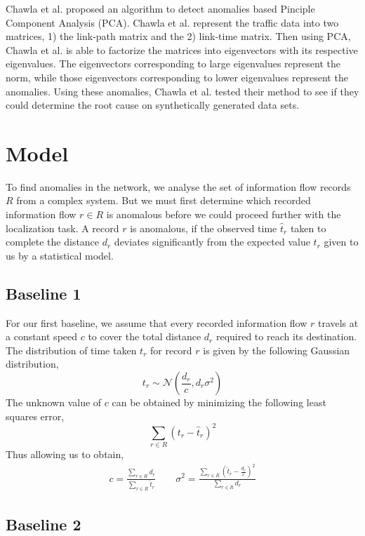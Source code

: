 \documentclass{sig-alternate}
\begin{document}
Chawla et al. \cite{Chawla2012} proposed an algorithm to detect anomalies based Pinciple Component Analysis (PCA). Chawla et al. \cite{Chawla2012} represent the traffic data into two matrices, 1) the link-path matrix and the 2) link-time matrix. Then using PCA, Chawla et al. \cite{Chawla2012} is able to factorize the matrices into eigenvectors with its respective eigenvalues. The eigenvectors corresponding to large eigenvalues represent the norm, while those eigenvectors corresponding to lower eigenvalues represent the anomalies. Using these anomalies, Chawla et al. \cite{Chawla2012} tested their method to see if they could determine the root cause on synthetically generated data sets.

\section{Model}
\label{sec:model}

To find anomalies in the network, we analyse the set of information flow records $R$ from a complex system. But we must first determine which recorded information flow $r \in R$ is anomalous before we could proceed further with the localization task. A record $r$ is anomalous, if the observed time $\hat{t}_r$ taken to complete the distance $d_r$ deviates significantly from the expected value $t_r$ given to us by a statistical model.

\subsection{Baseline 1}

For our first baseline, we assume that every recorded information flow $r$ travels at a constant speed $c$ to cover the total distance $d_r$ required to reach its destination. The distribution of time taken $t_r$ for record $r$ is given by the following Gaussian distribution,
\[ t_r \sim \mathcal{N} \left( \frac{d_r}{c}, d_r \sigma^2 \right) \]
The unknown value of $c$ can be obtained by minimizing the following least squares error,
\[ \sum_{r \in R} (t_r - \hat{t}_r)^2 \]
Thus allowing us to obtain,
\begin{gather*}
	c = \frac{\sum_{r \in R} d_r}{\sum_{r \in R} \hat{t}_r} \qquad
    \sigma^2 = \frac{ \sum_{r \in R} \left( \hat{t}_r - \frac{d_r}{c} \right)^2 }{ \sum_{r \in R} d_r }
\end{gather*}

\subsection{Baseline 2}
\end{document}
